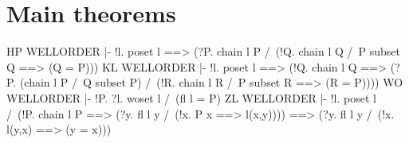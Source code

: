 \section{Main theorems}
\THEOREM HP WELLORDER
|- !l.
    poset l ==>
    (?P. chain l P /\ (!Q. chain l Q /\ P subset Q ==> (Q = P)))
\ENDTHEOREM
\THEOREM KL WELLORDER
|- !l.
    poset l ==>
    (!Q.
      chain l Q ==>
      (?P.
        (chain l P /\ Q subset P) /\
        (!R. chain l R /\ P subset R ==> (R = P))))
\ENDTHEOREM
\THEOREM WO WELLORDER
|- !P. ?l. woset l /\ (fl l = P)
\ENDTHEOREM
\THEOREM ZL WELLORDER
|- !l.
    poset l /\ (!P. chain l P ==> (?y. fl l y /\ (!x. P x ==> l(x,y)))) ==>
    (?y. fl l y /\ (!x. l(y,x) ==> (y = x)))
\ENDTHEOREM
